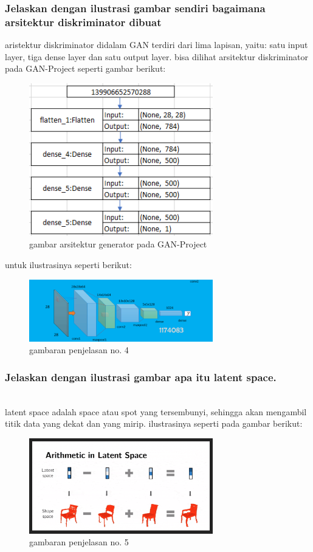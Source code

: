\subsubsection{Jelaskan dengan ilustrasi gambar sendiri bagaimana arsitektur diskriminator dibuat}
aristektur diskriminator didalam GAN terdiri dari lima lapisan, yaitu: satu input layer, tiga dense layer dan satu output layer. bisa dilihat arsitektur diskriminator pada GAN-Project seperti gambar berikut:
\begin{figure}[H]
	\centering
	\includegraphics[width=8cm]{figures/1174083/figures8/4a.png}
	\caption{gambar arsitektur generator pada GAN-Project}
\end{figure}
untuk ilustrasinya seperti berikut:
\begin{figure}[H]
	\centering
	\includegraphics[width=8cm]{figures/1174083/figures8/4.png}
	\caption{gambaran penjelasan no. 4}
\end{figure}

\subsubsection{Jelaskan dengan ilustrasi gambar apa itu latent space.}
\hfill\\
latent space adalah space atau spot yang tersembunyi, sehingga akan mengambil titik data yang dekat dan yang mirip. ilustrasinya seperti pada gambar berikut:
\begin{figure}[H]
	\centering
	\includegraphics[width=8cm]{figures/1174083/figures8/5.png}
	\caption{gambaran penjelasan no. 5}
\end{figure}


